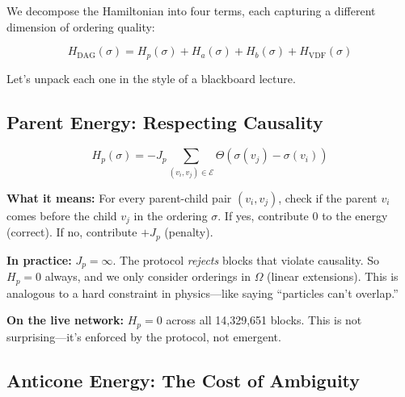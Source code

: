 \documentclass[11pt,a4paper]{article}
\begin{document}
We decompose the Hamiltonian into four terms, each capturing a different dimension of ordering quality:

\begin{equation}
\boxed{H_{\text{DAG}}(\sigma) = H_p(\sigma) + H_a(\sigma) + H_b(\sigma) + H_{\text{VDF}}(\sigma)}
\label{eq:hamiltonian}
\end{equation}

Let's unpack each one in the style of a blackboard lecture.

\subsection{Parent Energy: Respecting Causality}

\begin{blackboard}
\begin{equation}
H_p(\sigma) = -J_p \sum_{(v_i, v_j) \in \mathcal{E}} \Theta(\sigma(v_j) - \sigma(v_i))
\end{equation}

\textbf{What it means:} For every parent-child pair $(v_i, v_j)$, check if the parent $v_i$ comes before the child $v_j$ in the ordering $\sigma$. If yes, contribute $0$ to the energy (correct). If no, contribute $+J_p$ (penalty).

\textbf{In practice:} $J_p = \infty$. The protocol \emph{rejects} blocks that violate causality. So $H_p = 0$ always, and we only consider orderings in $\Omega$ (linear extensions). This is analogous to a hard constraint in physics---like saying ``particles can't overlap.''

\textbf{On the live network:} $H_p = 0$ across all 14,329,651 blocks. This is not surprising---it's enforced by the protocol, not emergent.
\end{blackboard}

\subsection{Anticone Energy: The Cost of Ambiguity}
\end{document}
